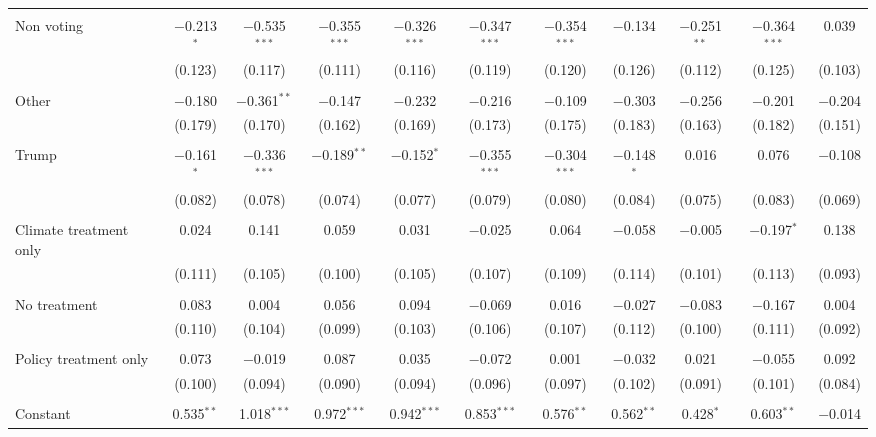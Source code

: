 \begin{tabular}{@{\extracolsep{5pt}}lcccccccccc}
  & & & & & & & & & & \\ 
 Non voting & $-$0.213$^{*}$ & $-$0.535$^{***}$ & $-$0.355$^{***}$ & $-$0.326$^{***}$ & $-$0.347$^{***}$ & $-$0.354$^{***}$ & $-$0.134 & $-$0.251$^{**}$ & $-$0.364$^{***}$ & 0.039 \\ 
  & (0.123) & (0.117) & (0.111) & (0.116) & (0.119) & (0.120) & (0.126) & (0.112) & (0.125) & (0.103) \\ 
  & & & & & & & & & & \\ 
 Other & $-$0.180 & $-$0.361$^{**}$ & $-$0.147 & $-$0.232 & $-$0.216 & $-$0.109 & $-$0.303 & $-$0.256 & $-$0.201 & $-$0.204 \\ 
  & (0.179) & (0.170) & (0.162) & (0.169) & (0.173) & (0.175) & (0.183) & (0.163) & (0.182) & (0.151) \\ 
  & & & & & & & & & & \\ 
 Trump & $-$0.161$^{*}$ & $-$0.336$^{***}$ & $-$0.189$^{**}$ & $-$0.152$^{*}$ & $-$0.355$^{***}$ & $-$0.304$^{***}$ & $-$0.148$^{*}$ & 0.016 & 0.076 & $-$0.108 \\ 
  & (0.082) & (0.078) & (0.074) & (0.077) & (0.079) & (0.080) & (0.084) & (0.075) & (0.083) & (0.069) \\ 
  & & & & & & & & & & \\ 
 Climate treatment only & 0.024 & 0.141 & 0.059 & 0.031 & $-$0.025 & 0.064 & $-$0.058 & $-$0.005 & $-$0.197$^{*}$ & 0.138 \\ 
  & (0.111) & (0.105) & (0.100) & (0.105) & (0.107) & (0.109) & (0.114) & (0.101) & (0.113) & (0.093) \\ 
  & & & & & & & & & & \\ 
 No treatment & 0.083 & 0.004 & 0.056 & 0.094 & $-$0.069 & 0.016 & $-$0.027 & $-$0.083 & $-$0.167 & 0.004 \\ 
  & (0.110) & (0.104) & (0.099) & (0.103) & (0.106) & (0.107) & (0.112) & (0.100) & (0.111) & (0.092) \\ 
  & & & & & & & & & & \\ 
 Policy treatment only & 0.073 & $-$0.019 & 0.087 & 0.035 & $-$0.072 & 0.001 & $-$0.032 & 0.021 & $-$0.055 & 0.092 \\ 
  & (0.100) & (0.094) & (0.090) & (0.094) & (0.096) & (0.097) & (0.102) & (0.091) & (0.101) & (0.084) \\ 
  & & & & & & & & & & \\ 
 Constant & 0.535$^{**}$ & 1.018$^{***}$ & 0.972$^{***}$ & 0.942$^{***}$ & 0.853$^{***}$ & 0.576$^{**}$ & 0.562$^{**}$ & 0.428$^{*}$ & 0.603$^{**}$ & $-$0.014 \\ 

\end{tabular}
